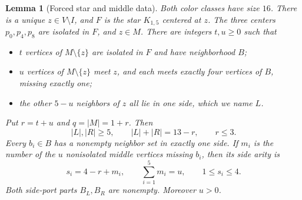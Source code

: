 \documentclass[11pt]{article}
\newtheorem{lemma}[theorem]{Lemma}
\begin{document}
\begin{lemma}[Forced star and middle data]\label{star}
Both color classes have size $16$. There is a unique $z\in V\setminus I$,
and $F$ is the star $K_{1,5}$ centered at $z$. The three centers
$p_0,p_4,p_8$ are isolated in $F$, and $z\in M$.
There are integers $t,u\geq0$ such that
\begin{itemize}
\item $t$ vertices of $M\setminus\{z\}$ are isolated in $F$ and have
neighborhood $B$;
\item $u$ vertices of $M\setminus\{z\}$ meet $z$, and each meets
exactly four vertices of $B$, missing exactly one;
\item the other $5-u$ neighbors of $z$ all lie in one side, which
we name $L$.
\end{itemize}
Put $r=t+u$ and $q=|M|=1+r$. Then
\[
 |L|,|R|\geq5,\qquad |L|+|R|=13-r,\qquad r\leq3.   \tag{1}
\]
Every $b_i\in B$ has a nonempty neighbor set in exactly one side.
If $m_i$ is the number of the $u$ nonisolated middle vertices missing
$b_i$, then its side arity is
\[
 s_i=4-r+m_i,\qquad \sum_{i=1}^5m_i=u,\qquad1\leq s_i\leq4. \tag{2}
\]
Both side-port parts $B_L,B_R$ are nonempty. Moreover $u>0$.
\end{lemma}
\end{document}

